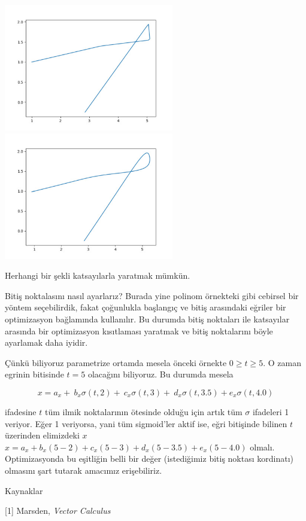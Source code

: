 \documentclass[12pt,fleqn]{article}\usepackage{../../common}
\begin{document}
\includegraphics[width=20em]{calc_multi_75_app_10.jpg}
\includegraphics[width=20em]{calc_multi_75_app_11.jpg}

Herhangi bir şekli katsayılarla yaratmak mümkün. 

Bitiş noktalasını nasıl ayarlarız? Burada yine polinom örnekteki gibi
cebirsel bir yöntem seçebilirdik, fakat çoğunlukla başlangıç ve bitiş
arasındaki eğriler bir optimizasyon bağlamında kullanılır. Bu durumda
bitiş noktaları ile katsayılar arasında bir optimizasyon kısıtlaması
yaratmak ve bitiş noktalarını böyle ayarlamak daha iyidir. 

Çünkü biliyoruz parametrize ortamda mesela önceki örnekte $0 \ge t \ge
5$. O zaman egrinin bitisinde $t=5$ olacağını biliyoruz. Bu durumda mesela 

$$
    x = a_x + \
        b_x \sigma(t,2) + \
        c_x \sigma(t,3) + \
        d_x \sigma(t,3.5) +
        e_x \sigma(t,4.0)
$$

ifadesine $t$ tüm ilmik noktalarının ötesinde olduğu için artık tüm
$\sigma$ ifadeleri 1 veriyor. Eğer 1 veriyorsa, yani tüm sigmoid'ler aktif
ise, eğri bitişinde bilinen $t$ üzerinden elimizdeki $x$ 
$x = a_x + b_x(5-2) + c_x(5-3) + d_x(5-3.5) + e_x(5-4.0)$
olmalı. Optimizasyonda bu eşitliğin belli bir değer (istediğimiz bitiş
noktası kordinatı) olmasını şart tutarak amacımız erişebiliriz.

Kaynaklar

[1] Marsden, {\em Vector Calculus}
\end{document}
